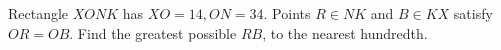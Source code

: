 Rectangle $XONK$ has $XO=14,ON=34$. Points $R\in NK$ and $B\in KX$ satisfy $OR=OB$. Find the greatest possible $RB$, to the nearest hundredth.
